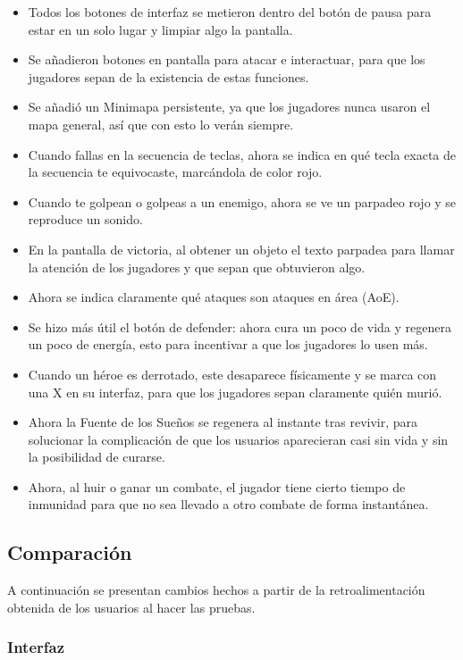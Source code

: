 \begin{itemize}
    \item Todos los botones de interfaz se metieron dentro del botón de pausa para estar en un solo lugar y limpiar algo la pantalla.
    \item Se añadieron botones en pantalla para atacar e interactuar, para que los jugadores sepan de la existencia de estas funciones.
    \item Se añadió un Minimapa persistente, ya que los jugadores nunca usaron el mapa general, así que con esto lo verán siempre.
    \item Cuando fallas en la secuencia de teclas, ahora se indica en qué tecla exacta de la secuencia te equivocaste, marcándola de color rojo.
    \item Cuando te golpean o golpeas a un enemigo, ahora se ve un parpadeo rojo y se reproduce un sonido.
    \item En la pantalla de victoria, al obtener un objeto el texto parpadea para llamar la atención de los jugadores y que sepan que obtuvieron algo.
    \item Ahora se indica claramente qué ataques son ataques en área (AoE).
    \item Se hizo más útil el botón de defender: ahora cura un poco de vida y regenera un poco de energía, esto para incentivar a que los jugadores lo usen más.
    \item Cuando un héroe es derrotado, este desaparece físicamente y se marca con una X en su interfaz, para que los jugadores sepan claramente quién murió.
    \item Ahora la Fuente de los Sueños se regenera al instante tras revivir, para solucionar la complicación de que los usuarios aparecieran casi sin vida y sin la posibilidad de curarse.
    \item Ahora, al huir o ganar un combate, el jugador tiene cierto tiempo de inmunidad para que no sea llevado a otro combate de forma instantánea.
\end{itemize}

\subsection{Comparación}

A continuación se presentan cambios hechos a partir de la retroalimentación obtenida de los usuarios al hacer las pruebas.\\

\subsubsection{Interfaz}

